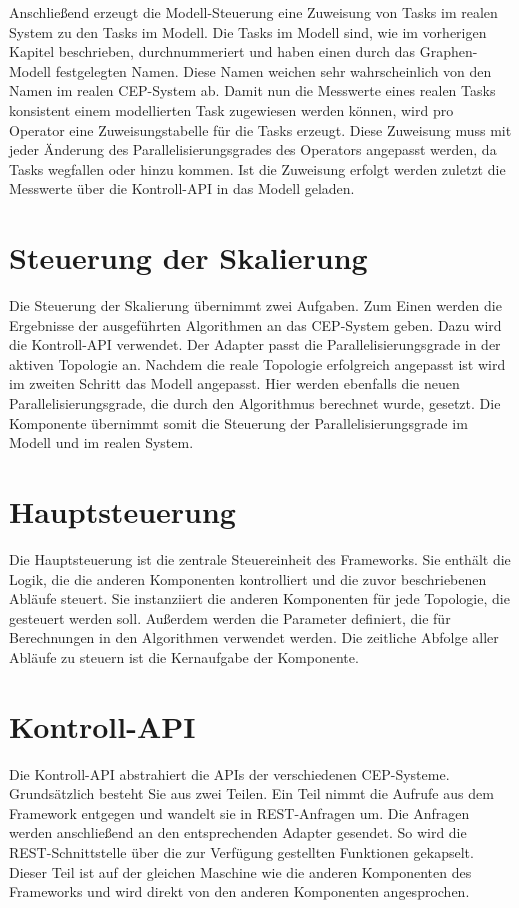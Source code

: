 Anschließend erzeugt die Modell-Steuerung eine Zuweisung von Tasks im realen System zu den Tasks im Modell.
Die Tasks im Modell sind, wie im vorherigen Kapitel beschrieben, durchnummeriert und haben einen durch das Graphen-Modell festgelegten Namen.
Diese Namen weichen sehr wahrscheinlich von den Namen im realen CEP-System ab.
Damit nun die Messwerte eines realen Tasks konsistent einem modellierten Task zugewiesen werden können, wird pro Operator eine Zuweisungstabelle für die Tasks erzeugt.
Diese Zuweisung muss mit jeder Änderung des Parallelisierungsgrades des Operators angepasst werden, da Tasks wegfallen oder hinzu kommen.
Ist die Zuweisung erfolgt werden zuletzt die Messwerte über die Kontroll-API in das Modell geladen.

\section{Steuerung der Skalierung}

Die Steuerung der Skalierung übernimmt zwei Aufgaben.
Zum Einen werden die Ergebnisse der ausgeführten Algorithmen an das CEP-System geben.
Dazu wird die Kontroll-API verwendet.
Der Adapter passt die Parallelisierungsgrade in der aktiven Topologie an.
Nachdem die reale Topologie erfolgreich angepasst ist wird im zweiten Schritt das Modell angepasst.
Hier werden ebenfalls die neuen Parallelisierungsgrade, die durch den Algorithmus berechnet wurde, gesetzt.
Die Komponente übernimmt somit die Steuerung der Parallelisierungsgrade im Modell und im realen System.

\section{Hauptsteuerung}

Die Hauptsteuerung ist die zentrale Steuereinheit des Frameworks.
Sie enthält die Logik, die die anderen Komponenten kontrolliert und die zuvor beschriebenen Abläufe steuert.
Sie instanziiert die anderen Komponenten für jede Topologie, die gesteuert werden soll.
Außerdem werden die Parameter definiert, die für Berechnungen in den Algorithmen verwendet werden.
Die zeitliche Abfolge aller Abläufe zu steuern ist die Kernaufgabe der Komponente.

\section{Kontroll-API}

Die Kontroll-API abstrahiert die APIs der verschiedenen CEP-Systeme.
Grundsätzlich besteht Sie aus zwei Teilen.
Ein Teil nimmt die Aufrufe aus dem Framework entgegen und wandelt sie in REST-Anfragen um.
Die Anfragen werden anschließend an den entsprechenden Adapter gesendet.
So wird die REST-Schnittstelle über die zur Verfügung gestellten Funktionen gekapselt.
Dieser Teil ist auf der gleichen Maschine wie die anderen Komponenten des Frameworks und wird direkt von den anderen Komponenten angesprochen.

